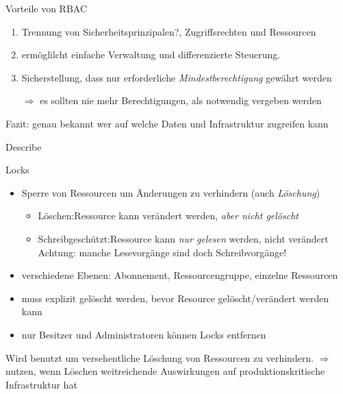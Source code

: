 \documentclass{scrartcl}
\newenvironment{flashcard}[2][]{%
    #1
    \vfill
    \centerline{\Large{#2}}
    \vfill
\newpage
}
{\newpage}
\begin{document}
    \begin{flashcard}[]{Vorteile von RBAC}
        \begin{enumerate}
            \item Trennung von Sicherheitsprinzipalen?, Zugriffsrechten und Ressourcen
            \item ermöglilcht einfache Verwaltung und differenzierte Steuerung.
            \item Sicherstellung, dass nur erforderliche \emph{Mindestberechtigung} gewährt werden
            \item[$\Rightarrow$] es sollten nie mehr Berechtigungen, als notwendig vergeben werden
        \end{enumerate}
        Fazit: genau bekannt wer auf welche Daten und Infrastruktur zugreifen kann
    \end{flashcard}

    \begin{flashcard}[Describe]{Locks}
        \begin{itemize}
            \item Sperre von Ressourcen um Änderungen zu verhindern (auch \emph{Löschung})
            \begin{itemize}
                \item Löschen:\newline Ressource kann verändert werden, \emph{aber nicht gelöscht}
                \item Schreibgeschützt:\newline Ressource kann \emph{nur gelesen} werden, nicht verändert\newline
                Achtung: manche Lesevorgänge sind doch Schreibvorgänge!
            \end{itemize}
            \item verschiedene Ebenen: Abonnement, Ressourcengruppe, einzelne Ressourcen
            \item muss explizit gelöscht werden, bevor Resource gelöscht/verändert werden kann
            \item nur Besitzer und Administratoren können Locks entfernen
        \end{itemize}
        
        Wird benutzt um versehentliche Löschung von Ressourcen zu verhindern. \newline
        $\Rightarrow$ nutzen, wenn Löschen weitreichende Auswirkungen auf produktionskritische Infrastruktur hat

    \end{flashcard}
\end{document}
